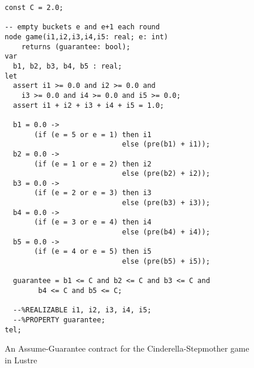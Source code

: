 \begin{figure}[!t]
\centering
 \begin{Verbatim}[fontsize=\footnotesize]
const C = 2.0;

-- empty buckets e and e+1 each round
node game(i1,i2,i3,i4,i5: real; e: int)
	returns (guarantee: bool);
var
  b1, b2, b3, b4, b5 : real;
let
  assert i1 >= 0.0 and i2 >= 0.0 and
 	i3 >= 0.0 and i4 >= 0.0 and i5 >= 0.0;
  assert i1 + i2 + i3 + i4 + i5 = 1.0;

  b1 = 0.0 ->
       (if (e = 5 or e = 1) then i1
                            else (pre(b1) + i1));
  b2 = 0.0 ->
       (if (e = 1 or e = 2) then i2
                            else (pre(b2) + i2));
  b3 = 0.0 ->
       (if (e = 2 or e = 3) then i3
                            else (pre(b3) + i3));
  b4 = 0.0 ->
       (if (e = 3 or e = 4) then i4
                            else (pre(b4) + i4));
  b5 = 0.0 ->
       (if (e = 4 or e = 5) then i5
                            else (pre(b5) + i5));

  guarantee = b1 <= C and b2 <= C and b3 <= C and
  	    b4 <= C and b5 <= C;

  --%REALIZABLE i1, i2, i3, i4, i5;
  --%PROPERTY guarantee;
tel;
 \end{Verbatim}
\caption{An Assume-Guarantee contract for the Cinderella-Stepmother game in Lustre}
\label{fg:cind}
\end{figure}

